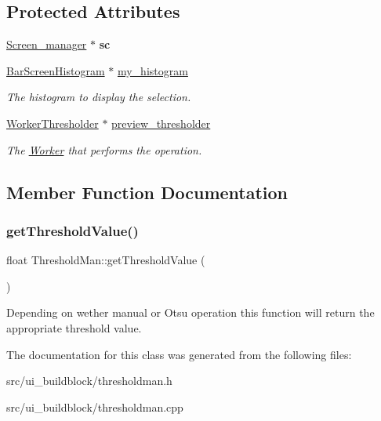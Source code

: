 \subsection*{Protected Attributes}
\begin{DoxyCompactItemize}
\item 
\mbox{\label{classThresholdMan_a56c9f2cd7a3c484871206c4c21e446b5}} 
\mbox{\hyperlink{classScreen__manager}{Screen\+\_\+manager}} $\ast$ {\bfseries sc}
\item 
\mbox{\label{classThresholdMan_acb9ba537b13a1e0b6cf4dbed0dc23a1e}} 
\mbox{\hyperlink{classBarScreenHistogram}{Bar\+Screen\+Histogram}} $\ast$ \mbox{\hyperlink{classThresholdMan_acb9ba537b13a1e0b6cf4dbed0dc23a1e}{my\+\_\+histogram}}
\begin{DoxyCompactList}\small\item\em The histogram to display the selection. \end{DoxyCompactList}\item 
\mbox{\label{classThresholdMan_ae437bf23f0a7132b592ab2d7016ca2ad}} 
\mbox{\hyperlink{classWorkerThresholder}{Worker\+Thresholder}} $\ast$ \mbox{\hyperlink{classThresholdMan_ae437bf23f0a7132b592ab2d7016ca2ad}{preview\+\_\+thresholder}}
\begin{DoxyCompactList}\small\item\em The \mbox{\hyperlink{classWorker}{Worker}} that performs the operation. \end{DoxyCompactList}\end{DoxyCompactItemize}


\subsection{Member Function Documentation}
\mbox{\label{classThresholdMan_a86ada2cb5a498fe86616031d1f5e0fc8}} 
\subsubsection{\texorpdfstring{get\+Threshold\+Value()}{getThresholdValue()}}
{\footnotesize\ttfamily float Threshold\+Man\+::get\+Threshold\+Value (\begin{DoxyParamCaption}{ }\end{DoxyParamCaption})}

Depending on wether manual or Otsu operation this function will return the appropriate threshold value. 

The documentation for this class was generated from the following files\+:\begin{DoxyCompactItemize}
\item 
src/ui\+\_\+buildblock/thresholdman.\+h\item 
src/ui\+\_\+buildblock/thresholdman.\+cpp\end{DoxyCompactItemize}
